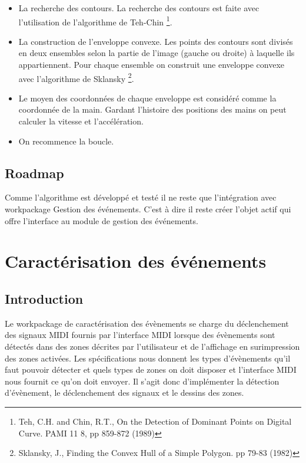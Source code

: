 \begin{itemize}
\item La recherche des contours. La recherche des contours est faite avec l'utilisation de l'algorithme de Teh-Chin \footnote{Teh, C.H. and Chin, R.T., On the Detection of Dominant Points on Digital Curve. PAMI 11 8, pp 859-872 (1989)}.
\item La construction de l'enveloppe convexe. Les points des contours sont divisés en deux ensembles selon la partie de l'image (gauche ou droite) à laquelle ils appartiennent. Pour chaque ensemble on construit une enveloppe convexe avec l'algorithme de Sklansky \footnote{Sklansky, J., Finding the Convex Hull of a Simple Polygon. pp 79-83 (1982)
}.
\item Le moyen des coordonnées de chaque enveloppe est considéré comme la coordonnée de la main. Gardant l'histoire des positions des mains on peut calculer la vitesse et l’accélération. 
\item On recommence la boucle.
\end{itemize}
\subsection{Roadmap}
\par Comme l'algorithme est développé et testé il ne reste que l'intégration avec workpackage Gestion des événements. C'est à dire il reste créer l'objet actif qui offre l'interface au module de gestion des événements. 
\section{Caractérisation des événements}
\subsection{Introduction}
\par Le workpackage de caractérisation des évènements se charge du déclenchement des signaux MIDI fournis par l'interface MIDI lorsque des évènements sont détectés dans des zones décrites par l'utilisateur et de l'affichage en surimpression des zones activées. Les spécifications nous donnent les types d'évènements qu'il faut pouvoir détecter et quels types de zones on doit disposer et l'interface MIDI nous fournit ce qu'on doit envoyer. Il s'agit donc d'implémenter la détection d'évènement, le déclenchement des signaux et le dessins des zones.
